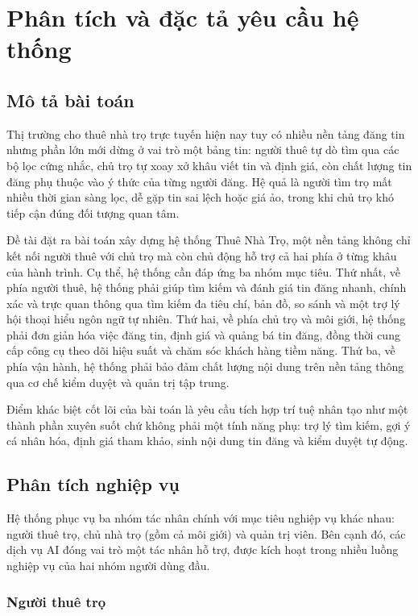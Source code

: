 \chapter{Phân tích và đặc tả yêu cầu hệ thống}
\label{Chapter3}

\section{Mô tả bài toán}

Thị trường cho thuê nhà trọ trực tuyến hiện nay tuy có nhiều nền tảng đăng tin nhưng phần lớn mới dừng ở vai trò một bảng tin: người thuê tự dò tìm qua các bộ lọc cứng nhắc, chủ trọ tự xoay xở khâu viết tin và định giá, còn chất lượng tin đăng phụ thuộc vào ý thức của từng người đăng. Hệ quả là người tìm trọ mất nhiều thời gian sàng lọc, dễ gặp tin sai lệch hoặc giá ảo, trong khi chủ trọ khó tiếp cận đúng đối tượng quan tâm.

Đề tài đặt ra bài toán xây dựng hệ thống Thuê Nhà Trọ, một nền tảng không chỉ kết nối người thuê với chủ trọ mà còn chủ động hỗ trợ cả hai phía ở từng khâu của hành trình. Cụ thể, hệ thống cần đáp ứng ba nhóm mục tiêu. Thứ nhất, về phía người thuê, hệ thống phải giúp tìm kiếm và đánh giá tin đăng nhanh, chính xác và trực quan thông qua tìm kiếm đa tiêu chí, bản đồ, so sánh và một trợ lý hội thoại hiểu ngôn ngữ tự nhiên. Thứ hai, về phía chủ trọ và môi giới, hệ thống phải đơn giản hóa việc đăng tin, định giá và quảng bá tin đăng, đồng thời cung cấp công cụ theo dõi hiệu suất và chăm sóc khách hàng tiềm năng. Thứ ba, về phía vận hành, hệ thống phải bảo đảm chất lượng nội dung trên nền tảng thông qua cơ chế kiểm duyệt và quản trị tập trung.

Điểm khác biệt cốt lõi của bài toán là yêu cầu tích hợp trí tuệ nhân tạo như một thành phần xuyên suốt chứ không phải một tính năng phụ: trợ lý tìm kiếm, gợi ý cá nhân hóa, định giá tham khảo, sinh nội dung tin đăng và kiểm duyệt tự động.

\section{Phân tích nghiệp vụ}

Hệ thống phục vụ ba nhóm tác nhân chính với mục tiêu nghiệp vụ khác nhau: người thuê trọ, chủ nhà trọ (gồm cả môi giới) và quản trị viên. Bên cạnh đó, các dịch vụ AI đóng vai trò một tác nhân hỗ trợ, được kích hoạt trong nhiều luồng nghiệp vụ của hai nhóm người dùng đầu.

\FloatBarrier
\subsection{Người thuê trọ}

